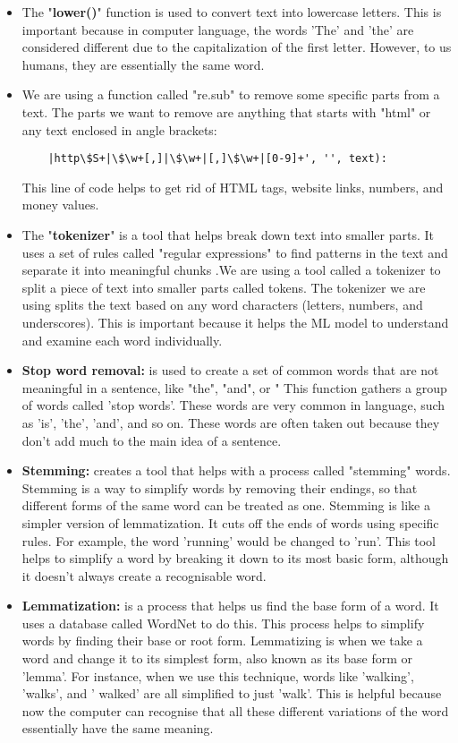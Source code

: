 \documentclass[12pt, a4paper,twoside]{report}
\theoremstyle{plain} %
\theoremstyle{definition} %
\theoremstyle{remark} %
\numberwithin{equation}{chapter}
\begin{document}
\begin{itemize}
    \item The "\textbf{lower()}" function is used to convert text into lowercase letters. This is important because in computer language, the words 'The' and 'the' are considered different due to the capitalization of the first letter. However, to us humans, they are essentially the same word.
    \item We are using a function called "re.sub" to remove some specific parts from a text. The parts we want to remove are anything that starts with "{html}" or any text enclosed in angle brackets:
    \begin{verbatim}
    |http\$S+|\$\w+[,]|\$\w+|[,]\$\w+|[0-9]+', '', text):    
    \end{verbatim}
    This line of code helps to get rid of HTML tags, website links, numbers, and money values.
    \item The "\textbf{tokenizer}" is a tool that helps break down text into smaller parts. It uses a set of rules called "regular expressions" to find patterns in the text and separate it into meaningful chunks .We are using a tool called a tokenizer to split a piece of text into smaller parts called tokens. The tokenizer we are using splits the text based on any word characters (letters, numbers, and underscores). This is important because it helps the ML model to understand and examine each word individually.
    \item \textbf{Stop word removal:} is used to create a set of common words that are not meaningful in a sentence, like "the", "and", or " This function gathers a group of words called 'stop words'. These words are very common in language, such as 'is', 'the', 'and', and so on. These words are often taken out because they don't add much to the main idea of a sentence.
    \item \textbf{Stemming: }creates a tool that helps with a process called "stemming" words. Stemming is a way to simplify words by removing their endings, so that different forms of the same word can be treated as one. Stemming is like a simpler version of lemmatization. It cuts off the ends of words using specific rules. For example, the word 'running' would be changed to 'run'. This tool helps to simplify a word by breaking it down to its most basic form, although it doesn't always create a recognisable word.
    \item \textbf{Lemmatization:}  is a process that helps us find the base form of a word. It uses a database called WordNet to do this. This process helps to simplify words by finding their base or root form. Lemmatizing is when we take a word and change it to its simplest form, also known as its base form or 'lemma'. For instance, when we use this technique, words like 'walking', 'walks', and ' walked' are all simplified to just 'walk'. This is helpful because now the computer can recognise that all these different variations of the word essentially have the same meaning.
\end{itemize}
\end{document}

